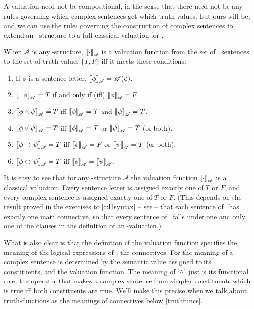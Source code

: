 A valuation need not be compositional, in the sense that there need not be any rules governing which complex sentences get which truth values. But ours will be, and we can use the rules governing the construction of complex sentences to extend an \lone\ structure to a full classical valuation for \lone.
\begin{definition}\label{value}
		When $\mathscr{A}$ is any \lone-structure, $\left\llbracket \cdot\right\rrbracket_{\mathscr{A}}$ is a valuation function from the set of \lone\ sentences to the set of truth values $\{T, F\}$ iff it meets these conditions: \begin{enumerate}
			\item If $\phi$ is a sentence letter, $\left\llbracket \phi\right\rrbracket_{\mathscr{A}} = \mathscr{A}(\phi)$.
			\item $\left\llbracket \neg \phi\right\rrbracket_{\mathscr{A}} = T$ if and only if (iff) $\left\llbracket \phi\right\rrbracket_{\mathscr{A}}= F$.
			\item $\left\llbracket \phi \wedge \psi\right\rrbracket_{\mathscr{A}} = T$ iff $\left\llbracket \phi\right\rrbracket_{\mathscr{A}}=T$ and $\left\llbracket \psi\right\rrbracket_{\mathscr{A}}=T$.
			\item $\left\llbracket \phi \vee \psi\right\rrbracket_{\mathscr{A}} = T$ iff $\left\llbracket \phi\right\rrbracket_{\mathscr{A}}=T$ or $\left\llbracket \psi\right\rrbracket_{\mathscr{A}}=T$ (or both).
			\item $\left\llbracket \phi \to \psi\right\rrbracket_{\mathscr{A}} = T$ iff $\left\llbracket \phi\right\rrbracket_{\mathscr{A}}=F$ or $\left\llbracket \psi\right\rrbracket_{\mathscr{A}}=T$ (or both).
			\item $\left\llbracket \phi \leftrightarrow \psi\right\rrbracket_{\mathscr{A}} = T$ iff $\left\llbracket \phi\right\rrbracket_{\mathscr{A}}=\left\llbracket \psi\right\rrbracket_{\mathscr{A}}$.
		\end{enumerate}
	\end{definition} It is easy to see that for any \lone-structure $\mathscr{A}$ the valuation function $\left\llbracket \cdot\right\rrbracket_{\mathscr{A}}$ is a classical valuation. Every sentence letter is assigned exactly one of $T$ or $F$, and every complex sentence is assigned exactly one of $T$ or $F$. (This depends on the result proved in the exercises to \autoref{c:l1syntax} – see \pageref{ans3} – that each sentence of \lone\ has exactly one main connective, so that every sentence of \lone\ falls under one and only one of the clauses in the definition of an \lone-valuation.)

What is also clear is that the definition of the valuation function specifies the meaning of the logical expressions of \lone, the connectives. For the meaning of a complex sentence is determined by the semantic value assigned to its constituents, and the valuation function. The meaning of `$\wedge$' just is its functional role, the operator that makes a complex sentence from simpler constituents which is true iff both constituents are true. We'll make this precise when we talk about truth-functions as the meanings of connectives below \autoref{truthfuncs}.

